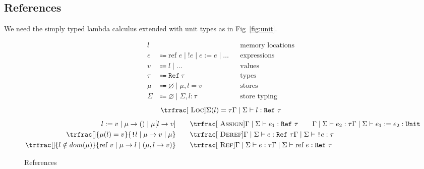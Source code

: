 \documentclass[nonacm]{acmart}
\newcommand{\unit}{\texttt{Unit}}
\newcommand{\reference}[1]{\text{ref } #1}
\begin{document}
\subsection{References}

We need the simply typed lambda calculus extended with unit types as in Fig~\ref{fig:unit}.

\begin{figure}
  \begin{framed}
    \begin{align*}
      l      &                                                                 &  & \text{memory locations} \\
      e      & \Coloneqq \reference{e} \mid \texttt{!}e \mid e := e \mid \dots &  & \text{expressions}      \\
      v      & \Coloneqq l \mid \dots                                          &  & \text{values}           \\
      \tau   & \Coloneqq \texttt{Ref}~\tau                                     &  & \text{types}            \\
      \mu    & \Coloneqq \varnothing \mid \mu, l = v                           &  & \text{stores}           \\
      \Sigma & \Coloneqq \varnothing \mid \Sigma, l : \tau                     &  & \text{store typing}
    \end{align*}
    \[
      \trfrac[~\textsc{Loc}]{\Sigma(l) = \tau}{\Gamma \mid \Sigma \vdash l : \texttt{Ref}~\tau}
    \]
    \begin{align*}
      l := v \mid \mu \rightarrow () \mid \mu[l \rightarrow v]
      \qquad &
      \trfrac[~\textsc{Assign}]{\Gamma \mid \Sigma \vdash e_1 :
        \texttt{Ref}~\tau \qquad \Gamma \mid \Sigma \vdash e_2 : \tau}{
      \Gamma \mid \Sigma \vdash e_1 := e_2 : \unit}                                                                           \\
      \trfrac[]{\mu (l) = v}{\texttt{!} l \mid \mu \rightarrow v \mid \mu}
      \qquad &
      \trfrac[~\textsc{Deref}]{\Gamma \mid \Sigma \vdash e : \texttt{Ref}~\tau}{\Gamma \mid \Sigma \vdash \texttt{!}e : \tau} \\
      \trfrac[]{l \notin dom(\mu)}{\reference{v} \mid \mu \rightarrow l \mid (\mu, l \rightarrow v)}
      \qquad &
      \trfrac[~\textsc{Ref}]{\Gamma \mid \Sigma \vdash e : \tau}{\Gamma \mid \Sigma \vdash \reference{e} : \texttt{Ref}~\tau}
    \end{align*}
  \end{framed}
  \caption{References}\label{fig:references}
\end{figure}
\end{document}
